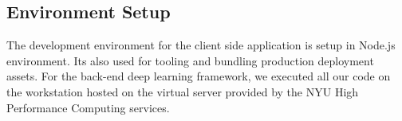 \subsection{Environment Setup}

The development environment for the client side application is setup in Node.js environment. Its also used for tooling and bundling production deployment assets. For the back-end deep learning framework, we executed all our code on the workstation hosted on the virtual server provided by the NYU High Performance Computing services. 


